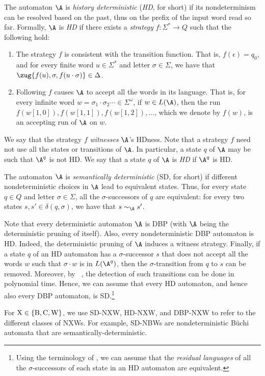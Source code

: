 \documentclass{lmcs}
\begin{document}
The automaton $\A$ is \emph{history deterministic} (\emph{HD}, for short) if its nondeterminism can be resolved based on the past, thus on the prefix of the input word read so far. Formally, $\A$ is \emph{HD} if there exists a {\em strategy\/} $f:\Sigma^* \to Q$ such that the following hold: 
\begin{enumerate}
	\item 
	The strategy $f$ is consistent with the transition function. That is, $f(\epsilon)=q_0$, and for every finite word $u \in \Sigma^*$ and letter $\sigma \in \Sigma$, we have that $\zug{f(u),\sigma,f(u \cdot \sigma)} \in \Delta$. 
	\item
	Following $f$ causes $\A$ to accept all the words in its language. That is, for every infinite word $w = \sigma_1 \cdot \sigma_2 \cdots \in \Sigma^\omega$, if $w \in L(\A)$, then the run $f(w[1, 0]), f(w[1, 1]), f(w[1, 2]), \ldots$, which we denote by $f(w)$, is 
	an accepting run of $\A$ on $w$. 
\end{enumerate}
We say that the strategy $f$ \emph{witnesses} $\A$'s HDness. 
Note that a strategy $f$ need not use all the states or transitions of $\A$. 
In particular, a state $q$ of $\A$ may be such that $\A^q$ is not HD. We say that a state $q$ of $\A$ is \emph{HD} if $\A^q$ is HD.


The automaton $\A$ is \emph{semantically deterministic\/} (SD, for short) if different nondeterministic choices in $\A$ lead to equivalent states. Thus, for every state $q\in Q$ and letter $\sigma \in \Sigma$, all the $\sigma$-successors of $q$ are equivalent: for every two states $s, s'\in \delta(q,\sigma)$, we have that $s \sim_{\A} s'$.  

Note that every deterministic automaton $\A$ is DBP (with $\A$ being the deterministic pruning of itself).  Also, every nondeterministic DBP automaton is HD. Indeed, the deterministic pruning of $\A$ induces a witness strategy. Finally, if a state $q$ of an HD automaton has a $\sigma$-successor $s$ that does not accept all the words $w$ such that $\sigma \cdot w$ is in $L(\A^q)$, then the $\sigma$-transition from $q$ to $s$ can be removed. Moreover, by ~\cite{HKR02,KS15, BK18}, the detection of such transitions can be done in polynomial time. Hence, we can assume that every HD automaton, and hence also every DBP automaton, is SD.\footnote{Using the terminology of \cite{KS15}, we can assume that the {\em residual languages\/} of all the $\sigma$-successors of each state in an HD automaton are equivalent.}

For ${\rm X} \in \{{\rm B,C,W}\}$, we use SD-NXW, HD-NXW, and DBP-NXW to refer to the different classes of NXWs. For example, SD-NBWs are nondeterministic B\"uchi automata that are semantically-deterministic. 
\end{document}
